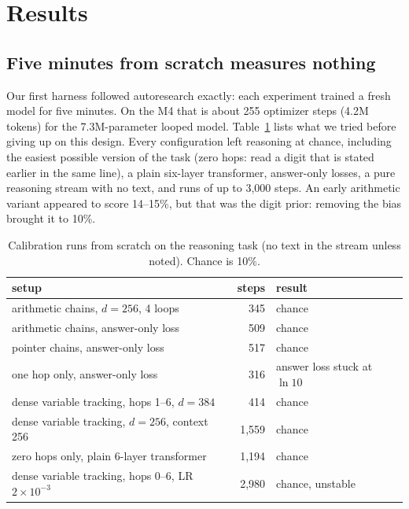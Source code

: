\section{Results}

\subsection{Five minutes from scratch measures nothing}\label{sec:calibration}
Our first harness followed autoresearch exactly: each experiment trained a fresh model for five
minutes. On the M4 that is about 255 optimizer steps (4.2M tokens) for the 7.3M-parameter looped model.
Table~\ref{tab:calib} lists what we tried before giving up on this design. Every configuration left
reasoning at chance, including the easiest possible version of the task (zero hops: read a digit that
is stated earlier in the same line), a plain six-layer transformer, answer-only losses, a pure reasoning
stream with no text, and runs of up to 3,000 steps. An early arithmetic variant appeared to score 14--15\%,
but that was the digit prior: removing the bias brought it to 10\%.

\begin{table}[h]
\centering\small
\begin{tabular}{lrl}
\toprule
setup & steps & result \\
\midrule
arithmetic chains, $d{=}256$, 4 loops & 345 & chance \\
arithmetic chains, answer-only loss & 509 & chance \\
pointer chains, answer-only loss & 517 & chance \\
one hop only, answer-only loss & 316 & answer loss stuck at $\ln 10$ \\
dense variable tracking, hops 1--6, $d{=}384$ & 414 & chance \\
dense variable tracking, $d{=}256$, context 256 & 1,559 & chance \\
zero hops only, plain 6-layer transformer & 1,194 & chance \\
dense variable tracking, hops 0--6, LR $2{\times}10^{-3}$ & 2,980 & chance, unstable \\
\bottomrule
\end{tabular}
\caption{Calibration runs from scratch on the reasoning task (no text in the stream unless noted).
Chance is 10\%.}
\label{tab:calib}
\end{table}

